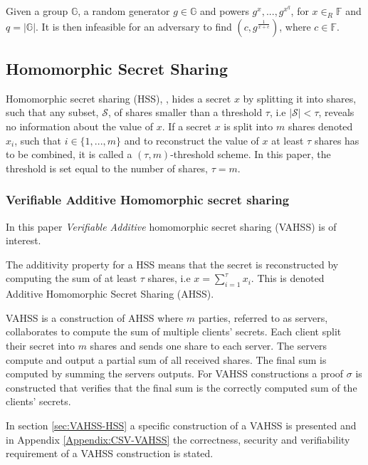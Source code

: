 \vspace{10pt}
\begin{Ass}
\label{ass:DHA}
 Given a group $\mathds{G}$, a random generator $g\in \mathds{G}$ and powers $g^x,...,g^{x^q}$, for $x \in_R \mathds{F}$ and  $q= |\mathds{G}|$. It is then  infeasible for an adversary to find $(c, g^{\frac{1}{x+c}})$, where $c \in \mathds{F}$.
\end{Ass}




\subsection*{Homomorphic Secret Sharing}
Homomorphic secret sharing (HSS), \cite{How_share_A_secret}, hides a secret $x$ by splitting it into shares, such that any subset, $\mathcal{S}$, of shares smaller than a threshold $\tau$, i.e $|\mathcal{S}|<\tau$, reveals no information about the value of $x$.  
If a secret $x$ is split into $m$ shares denoted $x_i$, such that $ i\in\{1,...,m\}$ and to reconstruct the value of $x$ at least $\tau$ shares has to be combined, it is called a $(\tau,m)$-threshold scheme. In this paper, the threshold is set equal to the number of shares,  $\tau=m$. 

\subsubsection*{Verifiable Additive Homomorphic secret sharing}
In this paper \textit{Verifiable Additive}  homomorphic secret sharing  (VAHSS) is of interest.  

The additivity property for a HSS means that the secret is reconstructed by computing the sum of at least $\tau$ shares, i.e $x = \sum_{i=1}^\tau x_i$. This is denoted Additive Homomorphic Secret Sharing (AHSS).

VAHSS is a construction of AHSS where $m$ parties, referred to as servers, collaborates to compute the sum of multiple clients' secrets. Each client split their secret into $m$ shares and sends one share to each server. The servers compute and output a partial sum of all received shares. The final sum is computed by summing the servers outputs. For VAHSS constructions a proof $\sigma$ is constructed that verifies that the final sum is the correctly computed sum of the clients' secrets. 

In section \ref{sec:VAHSS-HSS} a specific construction of a VAHSS is presented and in Appendix \ref{Appendix:CSV-VAHSS} the correctness, security and verifiability requirement of a VAHSS construction is stated.


